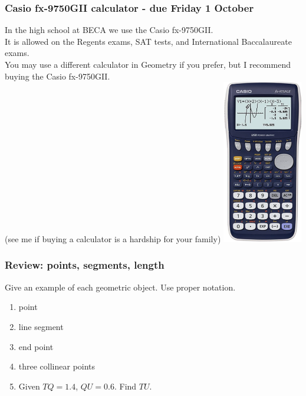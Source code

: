 \documentclass{beamer}
\begin{document}
  \frame
  {
    \frametitle{Casio fx-9750GII calculator - due Friday 1 October}
    \begin{multicols}{2}
    In the high school at BECA we use the Casio fx-9750GII.\\[5pt] 
    It is allowed on the Regents exams, SAT tests, and International Baccalaureate exams.\\[5pt]
    You may use a different calculator in Geometry if you prefer, but I recommend buying the Casio fx-9750GII.\\[5pt]
    (see me if buying a calculator is a hardship for your family)
    \includegraphics[width=3.5cm]{casio_fx-9750GII.png}
    \end{multicols}
  }

  \frame
  {
    \frametitle{Review: points, segments, length}
    Give an example of each geometric object. Use proper notation.
    \begin{enumerate}
      \item point
      \item line segment
      \item end point
      \item three collinear points
      \item Given $TQ=1.4$, $QU=0.6$. Find $TU$.
    \end{enumerate}
  }
\end{document}
